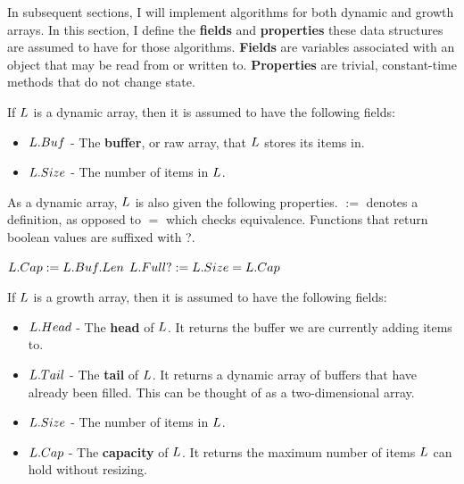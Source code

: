 In subsequent sections, I will implement algorithms for both dynamic and growth arrays. In this section, I define the \textbf{fields} and \textbf{properties} these data structures are assumed to have for those algorithms. \textbf{Fields} are variables associated with an object that may be read from or written to. \textbf{Properties} are trivial, constant-time methods that do not change state.

If $L$ is a dynamic array, then it is assumed to have the following fields:

\begin{itemize}
	\item $L.Buf$ - The \textbf{buffer}, or raw array, that $L$ stores its items in.
	\item $L.Size$ - The number of items in $L$.
\end{itemize}

As a dynamic array, $L$ is also given the following properties. $:=$ denotes a definition, as opposed to $=$ which checks equivalence. Functions that return boolean values are suffixed with ?.

\begin{algorithm}
	\begin{algorithmic}
		\State $L.Cap := L.Buf.Len$
		\State
		\State $L.Full? := L.Size = L.Cap$
	\end{algorithmic}
\end{algorithm}

If $L$ is a growth array, then it is assumed to have the following fields:

\begin{itemize}
	\item $L.Head$ - The \textbf{head} of $L$. It returns the buffer we are currently adding items to.
	\item $L.Tail$ - The \textbf{tail} of $L$. It returns a dynamic array of buffers that have already been filled. This can be thought of as a two-dimensional array.
	\item $L.Size$ - The number of items in $L$.
	\item $L.Cap$ - The \textbf{capacity} of $L$. It returns the maximum number of items $L$ can hold without resizing.
\end{itemize}

